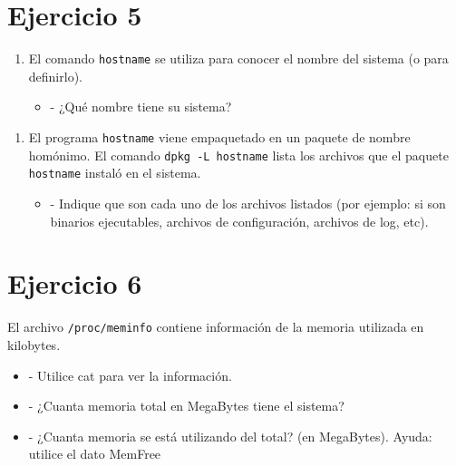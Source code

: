 \documentclass[12pt]{article}
\begin{document}
\section*{Ejercicio 5}
\begin{enumerate}
\item El comando \texttt{hostname} se utiliza para conocer el nombre del sistema (o para definirlo).
\begin{itemize}
\item - ¿Qué nombre tiene su sistema?
\end{itemize}
\end{enumerate}

\begin{enumerate}
\item El programa \texttt{hostname} viene empaquetado en un paquete de nombre homónimo.
El comando \texttt{dpkg -L hostname}  lista los archivos que el paquete \texttt{hostname} instaló en el sistema.
\begin{itemize}
\item - Indique que son cada uno de los archivos listados (por ejemplo: si son binarios ejecutables, archivos de configuración, archivos de log, etc).
\end{itemize}
\end{enumerate}



\section*{Ejercicio 6}
El archivo \texttt{/proc/meminfo} contiene información de la memoria utilizada en kilobytes.

\begin{itemize}
\item - Utilice cat para ver la información.
\item - ¿Cuanta memoria total en MegaBytes tiene el sistema?
\item - ¿Cuanta memoria se está utilizando del total? (en MegaBytes). Ayuda: utilice el dato MemFree
\end{itemize}
\end{document}
